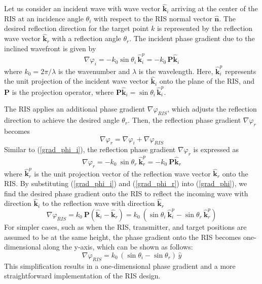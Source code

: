 \documentclass{IEEEoj}
\begin{document}
Let us consider an incident wave with wave vector $\mathbf{\hat{k}}_i$ arriving at the center of the RIS at an incidence angle $\theta_i$ with respect to the RIS normal vector $\mathbf{\hat{n}}$. The desired reflection direction for the target point $k$ is represented by the reflection wave vector $\mathbf{\hat{k}}_r$ with a reflection angle $\theta_r$. The incident phase gradient due to the inclined wavefront is given by
\begin{equation} \label{grad_phi_i}
	\nabla \varphi_i = - k_0 \sin\theta_i \, \mathbf{\hat{k}}_i^p = - k_0 \, \textbf{P} \mathbf{\hat{k}}_i
\end{equation}
where $k_0 = 2 \pi / \lambda$ is the wavenumber and $\lambda$ is the wavelength. Here, $\mathbf{\hat{k}}_i^p$ represents the unit projection of the incident wave vector $\mathbf{\hat{k}}_i$ onto the plane of the RIS, and $\textbf{P}$ is the projection operator, where $\textbf{P} \mathbf{\hat{k}}_i = \sin\theta_i \, \mathbf{\hat{k}}_i^p$.

The RIS applies an additional phase gradient $\nabla \varphi_{RIS}$, which adjusts the reflection direction to achieve the desired angle $\theta_r$. Then, the reflection phase gradient $\nabla \varphi_r$ becomes
\begin{equation} \label{grad_phi}
	\nabla \varphi_r = \nabla \varphi_i + \nabla \varphi_{RIS}
\end{equation}
Similar to (\ref{grad_phi_i}), the reflection phase gradient $\nabla \varphi_r$ is expressed as
\begin{equation} \label{grad_phi_r}
	\nabla \varphi_r = - k_0 \ \sin\theta_r \ \mathbf{\hat{k}}_r^p = - k_0 \ \textbf{P} \mathbf{\hat{k}}_r
\end{equation}
where $\mathbf{\hat{k}}_r^p$ is the unit projection vector of the reflection wave vector \( \mathbf{\hat{k}}_r \) onto the RIS. By substituting (\ref{grad_phi_i}) and (\ref{grad_phi_r}) into (\ref{grad_phi}), we find the desired phase gradient onto the RIS to reflect the incoming wave with direction $\mathbf{\hat{k}}_i$ to the reflection wave with direction $\mathbf{\hat{k}}_r$
\begin{equation} \label{grad_exp}
	\nabla \varphi_{RIS} = k_0 \ \textbf{P} (\mathbf{\hat{k}}_i - \mathbf{\hat{k}}_r) = k_0 \ (\sin\theta_i \ \mathbf{\hat{k}}_i^p - \sin\theta_r \ \mathbf{\hat{k}}_r^p)
\end{equation}
For simpler cases, such as when the RIS, transmitter, and target positions are assumed to be at the same height, the phase gradient onto the RIS becomes one-dimensional along the y-axis, which can be shown as follows:
\begin{equation} \label{grad_exp_simpler}
	\nabla \varphi_{RIS} = k_0 \, (\sin\theta_i - \sin\theta_r) \, \hat{y}
\end{equation}
This simplification results in a one-dimensional phase gradient and a more straightforward implementation of the RIS design.
\end{document}
